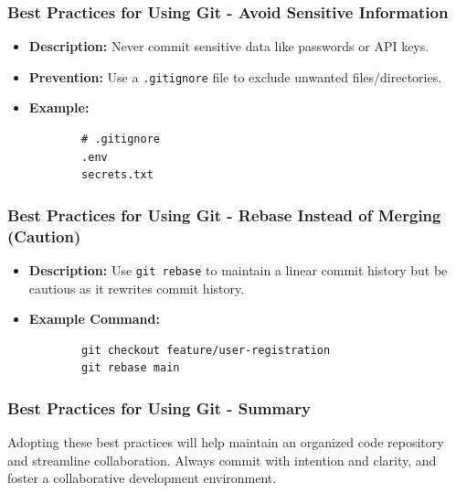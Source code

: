 \documentclass{beamer}
\begin{document}
\begin{frame}[fragile]
    \frametitle{Best Practices for Using Git - Avoid Sensitive Information}
    \begin{itemize}
        \item \textbf{Description:} Never commit sensitive data like passwords or API keys.
        \item \textbf{Prevention:} Use a \texttt{.gitignore} file to exclude unwanted files/directories.
        \item \textbf{Example:}
        \begin{lstlisting}
        # .gitignore
        .env
        secrets.txt
        \end{lstlisting}
    \end{itemize}
\end{frame}

\begin{frame}[fragile]
    \frametitle{Best Practices for Using Git - Rebase Instead of Merging (Caution)}
    \begin{itemize}
        \item \textbf{Description:} Use \texttt{git rebase} to maintain a linear commit history but be cautious as it rewrites commit history.
        \item \textbf{Example Command:}
        \begin{lstlisting}
        git checkout feature/user-registration
        git rebase main
        \end{lstlisting}
    \end{itemize}
\end{frame}

\begin{frame}[fragile]
    \frametitle{Best Practices for Using Git - Summary}
    Adopting these best practices will help maintain an organized code repository and streamline collaboration. Always commit with intention and clarity, and foster a collaborative development environment.
\end{frame}
\end{document}
